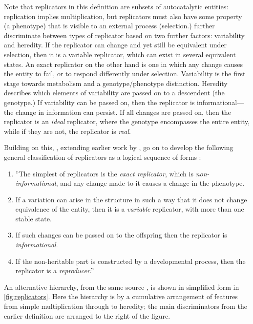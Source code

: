Note that replicators in this definition are subsets of autocatalytic entities: replication implies multiplication, but replicators must also have some property (a phenotype) that is visible to an external process (selection.)  further discriminate between types of replicator based on two further factors: variability and heredity. If the replicator can change and yet still be equivalent under selection, then it is a variable replicator, which can exist in several equivalent states. An exact replicator on the other hand is one in which any change causes the entity to fail, or to respond differently under selection. Variability is the first stage towards metabolism and a genotype/phenotype distinction. Heredity describes which elements of variability are passed on to a descendent (the genotype.) If variability can be passed on, then the replicator is informational---the change in information can persist. If all changes are passed on, then the replicator is an \emph{ideal} replicator, where the genotype encompasses the entire entity, while if they are not, the replicator is \emph{real}.

Building on this, \citeauthor{Zachar2010}, extending earlier work by \textcite{Szathmary1999,Szathmary:2006ty}, go on to develop the following general classification of replicators as a logical sequence of forms \parencite[p.21, line breaks and numbering added for emphasis]{Zachar2010}:  

\begin{enumerate}
	\item ''The simplest of replicators is the \emph{exact replicator}, which is \emph{non-informational}, and any change made to it causes a change in the phenotype. 
	\item If a variation can arise in the structure in such a way that it does not change equivalence of the entity, then it is a \emph{variable} replicator, with more than one stable state.
	\item If such changes can be passed on to the offspring then the replicator is \emph{informational}. 
	\item If the non-heritable part is constructed by a developmental process, then the replicator is a \emph{reproducer}.'' 
\end{enumerate}

An alternative hierarchy, from the same source \parencite{Zachar2010}, is shown in simplified form in \cref{fig:replicators}. Here the hierarchy is by a cumulative arrangement of features from simple multiplication through to heredity; the main discriminators from the earlier definition are arranged to the right of the figure.

